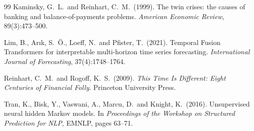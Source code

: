 \documentclass[11pt,a4paper]{article}
\begin{document}
\begin{thebibliography}{99}
Kaminsky, G.\ L.\ and Reinhart, C.\ M.\ (1999).
\newblock The twin crises: the causes of banking and balance-of-payments
problems.
\newblock \emph{American Economic Review}, 89(3):473--500.

Lim, B., Ar{\i}k, S.\ \"O., Loeff, N.\ and Pfister, T.\ (2021).
\newblock Temporal Fusion Transformers for interpretable multi-horizon time
series forecasting.
\newblock \emph{International Journal of Forecasting}, 37(4):1748--1764.

Reinhart, C.\ M.\ and Rogoff, K.\ S.\ (2009).
\newblock \emph{This Time Is Different: Eight Centuries of Financial Folly}.
\newblock Princeton University Press.

Tran, K., Bisk, Y., Vaswani, A., Marcu, D.\ and Knight, K.\ (2016).
\newblock Unsupervised neural hidden Markov models.
\newblock In \emph{Proceedings of the Workshop on Structured Prediction for
NLP}, EMNLP, pages 63--71.

\end{thebibliography}
\end{document}
